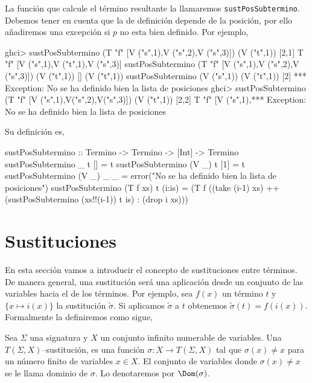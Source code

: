 La función que calcule el término resultante la llamaremos
\texttt{sustPosSubtermino}. Debemos tener en cuenta que la de
definición depende de la posición, por ello añadiremos una excepción
si $p$ no esta bien definido. Por ejemplo,

\begin{sesion}
ghci> sustPosSubtermino (T "f" [V ("s",1),V ("s",2),V ("s",3)]) 
                        (V ("t",1)) [2,1]
T "f" [V ("s",1),V ("t",1),V ("s",3)]
sustPosSubtermino (T "f" [V ("s",1),V ("s",2),V ("s",3)]) 
                  (V ("t",1)) []
(V ("t",1))
sustPosSubtermino (V ("s",1)) (V ("t",1)) [2]
*** Exception: No se ha definido bien la lista de posiciones
ghci> sustPosSubtermino (T "f" [V ("s",1),V("s",2),V("s",3)]) 
                        (V ("t",1)) [2,2]
T "f" [V ("s",1),*** Exception: No se ha definido bien la 
                     lista de posiciones
\end{sesion}

Su definición es,

\begin{codigo}
sustPosSubtermino :: Termino -> Termino -> [Int] -> Termino
sustPosSubtermino _ t [] = t
sustPosSubtermino (V _) t [1] = t
sustPosSubtermino (V _) _ _ = error("No se ha definido bien la 
                                     lista de posiciones")
sustPosSubtermino (T f xs) t (i:is) = (T f
    ((take (i-1) xs) ++
    (sustPosSubtermino (xs!!(i-1)) t is) :
    (drop i xs)))
\end{codigo}

\section {Sustituciones}

En esta sección vamos a introducir el concepto de sustituciones entre
términos. De manera general, una sustitución será una aplicación desde
un conjunto de las variables hacia el de los términos. Por ejemplo,
sea $f(x)$ un término $t$ y $\{x \mapsto i(x) \}$ la sustitución
$\tilde{\sigma}$. Si aplicamos $\tilde{\sigma}$ a $t$ obtenemos
$\tilde{\sigma}(t) = f(i(x))$. Formalmente la definiremos como sigue,

\begin{defi} 
  Sea $\Sigma$ una signatura y $X$ un conjunto infinito numerable de
  variables. Una $T(\Sigma, X)$--sustitución, es una función
  $\sigma : X \rightarrow T(\Sigma, X)$ tal que $\sigma(x) \neq x$
  para un número finito de variables $x \in X$. El conjunto de
  variables donde $\sigma(x) \neq x$ se le llama dominio de
  $\sigma$. Lo denotaremos por $\Dom (\sigma)$.
\end{defi}

